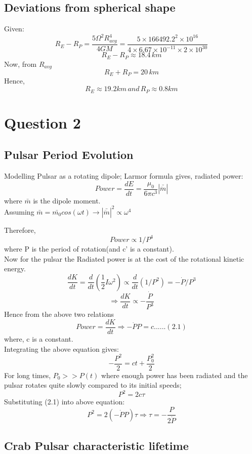 \documentclass[11pt]{article}
\begin{document}
	\subsection{Deviations from spherical shape}
	
	Given:
	\[
		R_E - R_P = \frac{5\Omega^2 R_{avg}^4}{4GM} = \frac{5\times 166492.2^2 \times 10^{16} }{4\times 6.67 \times 10^{-11} \times 2 \times 10^{30}} 
	\]
	\[
		R_E - R_P \approx 18.4 \, km
	\]	
	Now, from $R_{avg}$
	\[
		R_E + R_P = 20 \, km
	\]
	Hence,
	\[
		\boxed{R_E \approx 19.2 km \, and \, R_P \approx 0.8 km}
	\]
	

	
	\section{\color{teal} Question 2}
	
	\subsection{Pulsar Period Evolution}
	
	Modelling Pulsar as a rotating dipole; Larmor formula gives, radiated power:
	\[
		Power = \frac{dE}{dt} = \frac{\mu_0}{6\pi c^3}|\bar{\ddot{m}}|
	\]
	where $\bar{m}$ is the dipole moment.\\
	Assuming $\bar{m} = \bar{m_0}cos(\omega t) \rightarrow |\bar{\ddot{m}}|^2 \propto \omega^4$
	
	Therefore, \[ Power \propto 1/P^4 \]
	where P is the period of rotation(and c' is a constant).\\
	
	Now for the pulsar the Radiated power is at the cost of the rotational kinetic energy.
	\[
		\frac{dK}{dt} = \frac{d}{dt}( \frac{1}{2}I \omega^2) \propto \frac{d}{dt} (1/P^2) = - \dot{P}/P^3 
	\]
	\[
		\Rightarrow \frac{dK}{dt} \propto - \frac{\dot{P}}{P^3}
	\]
	Hence from the above two relations
	\[
		Power = \frac{dK}{dt} \Rightarrow -\dot{P}P = c......(2.1)
	\]
	where, c is a constant.\\
	
	Integrating the above equation gives:
	\[
		-\frac{P^2}{2} = ct + \frac{P_0^2}{2}
	\] 
	For long times, \(P_0 >> P(t)\) where enough power has been radiated and the pulsar rotates quite slowly compared to its initial speeds;
	\[
		P^2 = 2c \tau
	\]
	Substituting (2.1) into above equation:
	\[
		P^2 = 2(-\dot{P}P)\tau \Rightarrow \boxed{\tau = - \frac{P}{2\dot{P}}} 
	\]
	
	\subsection{Crab Pulsar characteristic lifetime}
	
\end{document}

